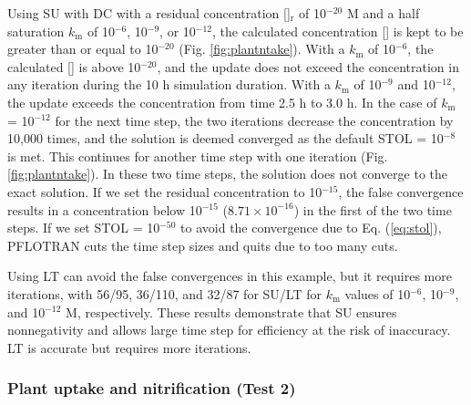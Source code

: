 \documentclass[gmd, manuscript]{copernicus}
\begin{document}
Using SU with DC with a residual concentration []$_\text{r}$ of 10$^{-20}$ \unit{M}
and a half saturation $k_\text{m}$ of 10$^{-6}$,
10$^{-9}$, or 10$^{-12}$, the calculated concentration [] is kept
to be greater than or equal to 10$^{-20}$ (Fig. \ref{fig:plantntake}). With
a $k_\text{m}$ of 10$^{-6}$, the calculated [] is above 10$^{-20}$,
and the update does not exceed the concentration in any iteration during the 10
\unit{h} simulation duration. With a $k_\text{m}$ of 10$^{-9}$ and 10$^{-12}$,
the update exceeds the concentration from time 2.5 h to 3.0 \unit{h}. In the
case of $k_\text{m}$ = 10$^{-12}$  for the next time step, the two
iterations decrease the concentration by 10,000 times, and the solution is
deemed converged as the default STOL = 10$^{-8}$ is met.  This continues for
another time step with one iteration (Fig. \ref{fig:plantntake}). In these two
time steps, the solution does not converge to the exact solution. If we set the
residual concentration to 10$^{-15}$, the false convergence results in a
concentration below 10$^{-15}$ ($8.71\times10^{-16}$) in the first of the two
time steps. If we set STOL = 10$^{-50}$ to avoid the convergence due to Eq.
(\ref{eq:stol}), PFLOTRAN cuts the time step sizes and quits due to too many cuts.

Using LT can avoid the false convergences in this example, but it requires more
iterations, with 56/95, 36/110, and 32/87 for SU/LT for $k_\text{m}$ values of
10$^{-6}$, 10$^{-9}$, and 10$^{-12}$ M, respectively. These results demonstrate
that SU ensures nonnegativity and allows large time step for efficiency at the
risk of inaccuracy. LT is accurate but requires more iterations. 

\subsubsection{Plant  uptake and nitrification (Test 2)}
\end{document}
